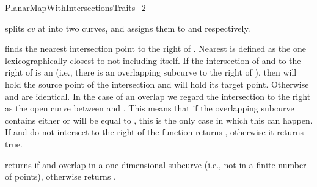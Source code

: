 \begin{ccRefConcept}{PlanarMapWithIntersectionsTraits_2}


  {splits $cv$ at  into two curves, and assigns them to
   and  respectively.
  }

{finds the
nearest intersection point to the right of . Nearest is defined as the
one lexicographically closest to  not including  itself.
If the intersection of  and  to the
right of  is an  (i.e., there is an overlapping subcurve
to the right of ),
then  will hold the source point of the intersection and
 will hold its target point. Otherwise  and  are
identical. In the case of an overlap we regard the intersection
to the right as the open curve between  and . This means that
if the overlapping subcurve contains  either  or  will
be equal to , this is the only case in which this can happen.
If  and  do not intersect to the right of 
the function returns , otherwise it returns true.
}


{returns  if  and  overlap
in a one-dimensional subcurve (i.e., not in a finite number
of points), otherwise returns
.}


\end{ccRefConcept}
